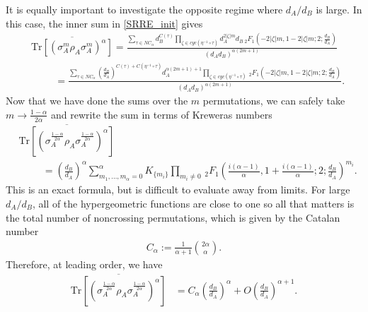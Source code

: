 \documentclass[a4paper,11pt]{article}
\newcommand{\Tr}{\text{Tr}}
\begin{document}
It is equally important to investigate the opposite regime where $d_A/d_B$ is large. In this case, the inner sum in \eqref{SRRE_init} gives
\begin{align}
    &\overline{\Tr\left[\left( \sigma_A^m\rho_A \sigma_A^m\right)^{\alpha} \right]}
    =\frac{\sum_{\tau \in NC_{\alpha} } d_B^{C(\tau)}\prod_{\zeta \in cyc(\eta^{-1}\circ \tau)}d_A^{2 |\zeta| m} d_B \, _2F_1\left(-2 |\zeta| m,1-2 |\zeta|
   m;2;\frac{d_B}{d_A}\right)}{(d_A d_B)^{{\alpha} (2m+1)}}
   \nonumber
   \\
   &\hspace{1cm}=\frac{\sum_{\tau \in NC_{\alpha}} \left(\frac{d_B}{d_A}\right)^{C(\tau)+C(\eta^{-1}\circ\tau)} d_A^{{\alpha}(2m+1)+1} \prod_{\zeta \in cyc(\eta^{-1}\circ \tau)}  \, _2F_1\left(-2 |\zeta| m,1-2 |\zeta|
   m;2;\frac{d_B}{d_A}\right)}{(d_A d_B)^{{\alpha}(2m+1)}}.
\end{align}
Now that we have done the sums over the $m$ permutations, we can safely take $m \rightarrow \frac{1-\alpha}{2\alpha}$ and rewrite the sum in terms of Kreweras numbers 
\begin{align}
    &\overline{\Tr\left[\left( \sigma_A^{\frac{1-{\alpha}}{2{\alpha}}}\rho_A \sigma_A^{\frac{1-{\alpha}}{2{\alpha}}}\right)^{\alpha}\right]}
   \nonumber
   \\
   &\hspace{1cm}=\left(\frac{d_B}{d_A}\right)^{\alpha }\sum_{m_1,\dots, m_{\alpha} = 0}^{\alpha}K_{\{m_i\}}\prod_{m_i \neq 0} \, _2F_1\left(\frac{i(\alpha-1)}{\alpha},1+\frac{i(\alpha-1)}{\alpha};2;\frac{d_B}{d_A}\right)^{m_i}.
\end{align}
This is an exact formula, but is difficult to evaluate away from limits. For large $d_A/d_B$, all of the hypergeometric functions are close to one so all that matters is the total number of noncrossing permutations, which is given by the Catalan number
\begin{align}
    C_{\alpha}:= \frac{1}{\alpha + 1}\binom{2\alpha}{\alpha}.
\end{align}
Therefore, at leading order, we have
\begin{align}
    \overline{\Tr\left[\left( \sigma_A^{\frac{1-{\alpha}}{2{\alpha}}}\rho^{\ }_A \sigma_A^{\frac{1-{\alpha}}{2{\alpha}}}\right)^{\alpha}
    \right]}
   &=C_{\alpha}\left(\frac{d_B}{d_A}\right)^{\alpha } + O\left(\frac{d_B}{d_A}\right)^{\alpha + 1}.
\end{align}
\end{document}
